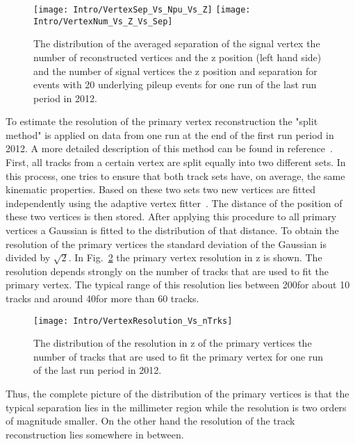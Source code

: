 \begin{figure}[Htb]
    \centering
    \texttt{[image: Intro/VertexSep\_Vs\_Npu\_Vs\_Z]}
    \texttt{[image: Intro/VertexNum\_Vs\_Z\_Vs\_Sep]}
    \caption[Vertex separation \vs number of reconstructed vertices and \vs z position of the vertex. Number of signal vertices \vs z position and separation for events with 20 underlying pileup events]{The distribution of the averaged separation of the signal vertex \vs the number of reconstructed vertices and the z position (left hand side) and the number of signal vertices \vs the z position and separation for events with 20 underlying pileup events for one run of the last run period in 2012. \label{plot:IntroVertexSep2D}}
\end{figure}

To estimate the resolution of the primary vertex reconstruction the "split method" is applied on data from one run at the end of the first run period in 2012. A more detailed description of this method can be found in reference~. First, all tracks from a certain vertex are split equally into two different sets. In this process, one tries to ensure that both track sets have, on average, the same kinematic properties. Based on these two sets two new vertices are fitted independently using the adaptive vertex fitter~\cite{CMS-PAPER-TRK-11-001}. The distance of the position of these two vertices is then stored. After applying this procedure to all primary vertices a Gaussian is fitted to the distribution of that distance. To obtain the resolution of the primary vertices the standard deviation of the Gaussian is divided by $\sqrt{2}$. In Fig.~\ref{plot:IntroVertexRes} the primary vertex resolution in z is shown. The resolution depends strongly on the number of tracks that are used to fit the primary vertex. The typical range of this resolution lies between 200\mum for about 10 tracks and around 40\mum for more than 60 tracks.

\begin{figure}[Htb]
    \centering
    \texttt{[image: Intro/VertexResolution\_Vs\_nTrks]}
    \caption[Vertex resolution \vs number of used tracks]{The distribution of the resolution in z of the primary vertices \vs the number of tracks that are used to fit the primary vertex for one run of the last run period in 2012. \label{plot:IntroVertexRes}}
\end{figure}

Thus, the complete picture of the distribution of the primary vertices is that the typical separation lies in the millimeter region while the resolution is two orders of magnitude smaller. On the other hand the resolution of the track reconstruction lies somewhere in between.\\

